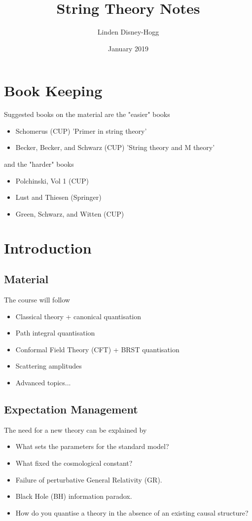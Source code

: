 \documentclass{article}
\title{String Theory Notes}
\author{Linden Disney-Hogg}
\date{January 2019}
\begin{document}
\maketitle
\tableofcontents


\section{Book Keeping}
Suggested books on the material are the "easier" books 
\begin{itemize}
    \item Schomerus (CUP) 'Primer in string theory'
    \item Becker, Becker, and Schwarz (CUP) 'String theory and M theory'
\end{itemize}
and the "harder" books 
\begin{itemize}
    \item Polchinski, Vol 1 (CUP) 
    \item Lust and Thiesen (Springer) 
    \item Green, Schwarz, and Witten (CUP)
\end{itemize}

\section{Introduction}
\subsection{Material}
The course will follow 
\begin{itemize}
    \item Classical theory + canonical quantisation 
    \item Path integral quantisation
    \item Conformal Field Theory (CFT) + BRST quantisation
    \item Scattering amplitudes 
    \item Advanced topics...
\end{itemize}

\subsection{Expectation Management}
The need for a new theory can be explained by 
\begin{itemize}
    \item What sets the parameters for the standard model? 
    \item What fixed the cosmological constant? 
    \item Failure of perturbative General Relativity (GR).
    \item Black Hole (BH) information paradox. 
    \item How do you quantise a theory in the absence of an existing causal structure? 
\end{itemize}
\end{document}

